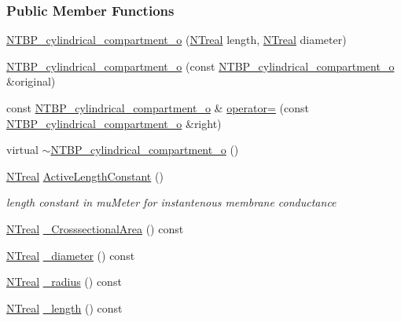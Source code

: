 \subsubsection*{Public Member Functions}
\begin{DoxyCompactItemize}
\item 
\hyperlink{class_n_t_b_p__cylindrical__compartment__o_a91d800b7103582ebef04d58c1da93002}{NTBP\_\-cylindrical\_\-compartment\_\-o} (\hyperlink{nt__types_8h_a814a97893e9deb1eedcc7604529ba80d}{NTreal} length, \hyperlink{nt__types_8h_a814a97893e9deb1eedcc7604529ba80d}{NTreal} diameter)
\item 
\hyperlink{class_n_t_b_p__cylindrical__compartment__o_aea3a6d21b6f91f19639a1b82bc0d0498}{NTBP\_\-cylindrical\_\-compartment\_\-o} (const \hyperlink{class_n_t_b_p__cylindrical__compartment__o}{NTBP\_\-cylindrical\_\-compartment\_\-o} \&original)
\item 
const \hyperlink{class_n_t_b_p__cylindrical__compartment__o}{NTBP\_\-cylindrical\_\-compartment\_\-o} \& \hyperlink{class_n_t_b_p__cylindrical__compartment__o_adf04295a33091e1b7609760e4c78922d}{operator=} (const \hyperlink{class_n_t_b_p__cylindrical__compartment__o}{NTBP\_\-cylindrical\_\-compartment\_\-o} \&right)
\item 
virtual \hyperlink{class_n_t_b_p__cylindrical__compartment__o_a8349944b5da371110204a16cb6da77db}{$\sim$NTBP\_\-cylindrical\_\-compartment\_\-o} ()
\item 
\hyperlink{nt__types_8h_a814a97893e9deb1eedcc7604529ba80d}{NTreal} \hyperlink{class_n_t_b_p__cylindrical__compartment__o_a977ceb437a826ba81a1d61c18ed6e9dd}{ActiveLengthConstant} ()
\begin{DoxyCompactList}\small\item\em length constant in muMeter for instantenous membrane conductance \item\end{DoxyCompactList}\item 
\hyperlink{nt__types_8h_a814a97893e9deb1eedcc7604529ba80d}{NTreal} \hyperlink{class_n_t_b_p__cylindrical__compartment__o_a753c8fa860af10a40e87e7f1b101e51c}{\_\-CrosssectionalArea} () const 
\item 
\hyperlink{nt__types_8h_a814a97893e9deb1eedcc7604529ba80d}{NTreal} \hyperlink{class_n_t_b_p__cylindrical__compartment__o_a4b27833a83f11f6630bb14ceac23c44f}{\_\-diameter} () const 
\item 
\hyperlink{nt__types_8h_a814a97893e9deb1eedcc7604529ba80d}{NTreal} \hyperlink{class_n_t_b_p__cylindrical__compartment__o_ac5b3728652877d16b71fc1bfb99c6181}{\_\-radius} () const 
\item 
\hyperlink{nt__types_8h_a814a97893e9deb1eedcc7604529ba80d}{NTreal} \hyperlink{class_n_t_b_p__cylindrical__compartment__o_ae1ab2295345f2dc08c401beb45b3a8fb}{\_\-length} () const 
\end{DoxyCompactItemize}


